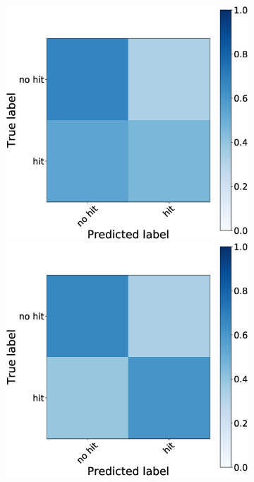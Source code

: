 \documentclass[journal]{IEEEtran}
\begin{document}
{{\begin{figure}[h!]
\begin{subfigure}{0.5\textwidth}
\centering
\includegraphics[scale=0.14]{revisedimages/matrix_1.eps}
\includegraphics[scale=0.14]{revisedimages/matrix_2.eps}\\

\end{subfigure}
\end{figure}}}
\end{document}
